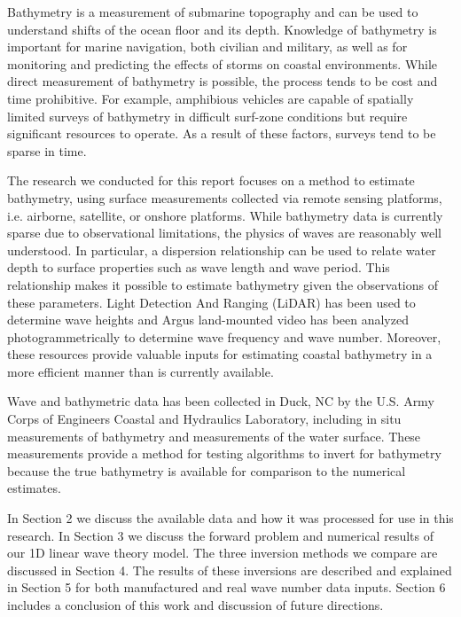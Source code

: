 Bathymetry is a measurement of submarine topography and can be used to understand shifts of the ocean floor and its depth. Knowledge of bathymetry is important for marine navigation, both civilian and military, as well as for monitoring and predicting the effects of storms on coastal environments. While direct measurement of bathymetry is possible, the process tends to be cost and time prohibitive. For example, amphibious vehicles are capable of spatially limited surveys of bathymetry in difficult surf-zone conditions but require significant resources to operate. As a result of these factors, surveys tend to be sparse in time. 


The research we conducted for this report focuses on a method to estimate bathymetry, using surface measurements collected via remote sensing platforms, i.e. airborne, satellite, or onshore platforms. While bathymetry data is currently sparse due to observational limitations, the physics of waves are reasonably well understood. In particular, a dispersion relationship can be used to relate water depth to surface properties such as wave length and wave period. This relationship makes it possible to estimate bathymetry given the observations of these parameters. Light Detection And Ranging (LiDAR) has been used to determine wave heights and Argus land-mounted video has been analyzed photogrammetrically to determine wave frequency and wave number. Moreover, these resources  provide valuable inputs for estimating coastal bathymetry in a more efficient manner than is currently available.

Wave and bathymetric data has been collected in Duck, NC by the U.S. Army Corps of Engineers Coastal and Hydraulics Laboratory, including in situ measurements of bathymetry and measurements of the water surface. These measurements provide a method for testing algorithms to invert for bathymetry because the true bathymetry is available for comparison to the numerical estimates.


In Section 2 we discuss the available data and how it was processed for use in this research. In Section 3 we discuss the forward problem and numerical results of our 1D linear wave theory model. The three inversion methods we compare are discussed in Section 4. The results of these inversions are described and explained in Section 5 for both manufactured and real wave number data inputs. Section 6 includes a conclusion of this work and discussion of future directions. 

